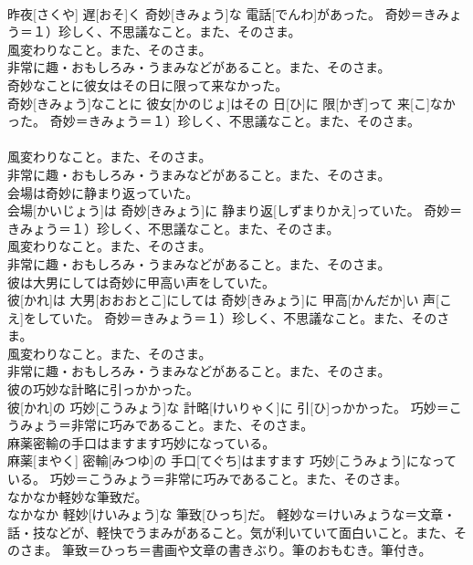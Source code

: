 \documentclass[8pt]{extreport}
\begin{document}
\begin{CJK}{UTF8}{min}
{\\	昨夜[さくや] 遅[おそ]く 奇妙[きみょう]な 電話[でんわ]があった。	奇妙＝きみょう＝１）珍しく、不思議なこと。また、そのさま。 　　　　　　　　
\\	風変わりなこと。また、そのさま。 　　　　　　　　
\\	非常に趣・おもしろみ・うまみなどがあること。また、そのさま。
\\	奇妙なことに彼女はその日に限って来なかった。	
\\	奇妙[きみょう]なことに 彼女[かのじょ]はその 日[ひ]に 限[かぎ]って 来[こ]なかった。	奇妙＝きみょう＝１）珍しく、不思議なこと。また、そのさま。 　　　　　　　　
\\	風変わりなこと。また、そのさま。 　　　　　　　　
\\	非常に趣・おもしろみ・うまみなどがあること。また、そのさま。
\\	会場は奇妙に静まり返っていた。	
\\	会場[かいじょう]は 奇妙[きみょう]に 静まり返[しずまりかえ]っていた。	奇妙＝きみょう＝１）珍しく、不思議なこと。また、そのさま。 　　　　　　　　
\\	風変わりなこと。また、そのさま。 　　　　　　　　
\\	非常に趣・おもしろみ・うまみなどがあること。また、そのさま。
\\	彼は大男にしては奇妙に甲高い声をしていた。	
\\	彼[かれ]は 大男[おおおとこ]にしては 奇妙[きみょう]に 甲高[かんだか]い 声[こえ]をしていた。	奇妙＝きみょう＝１）珍しく、不思議なこと。また、そのさま。 　　　　　　　　
\\	風変わりなこと。また、そのさま。 　　　　　　　　
\\	非常に趣・おもしろみ・うまみなどがあること。また、そのさま。
\\	彼の巧妙な計略に引っかかった。	
\\	彼[かれ]の 巧妙[こうみょう]な 計略[けいりゃく]に 引[ひ]っかかった。	巧妙＝こうみょう＝非常に巧みであること。また、そのさま。
\\	麻薬密輸の手口はますます巧妙になっている。	
\\	麻薬[まやく] 密輸[みつゆ]の 手口[てぐち]はますます 巧妙[こうみょう]になっている。	巧妙＝こうみょう＝非常に巧みであること。また、そのさま。
\\	なかなか軽妙な筆致だ。	
\\	なかなか 軽妙[けいみょう]な 筆致[ひっち]だ。	軽妙な＝けいみょうな＝文章・話・技などが、軽快でうまみがあること。気が利いていて面白いこと。また、そのさま。 筆致＝ひっち＝書画や文章の書きぶり。筆のおもむき。筆付き。
}
\end{CJK}
\end{document}
